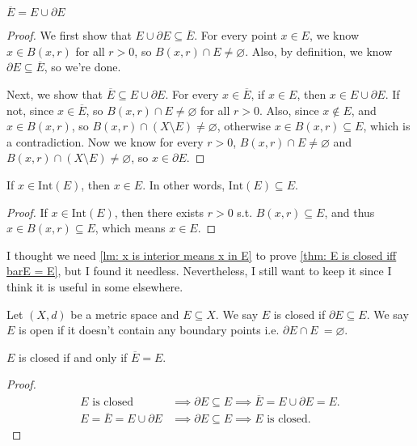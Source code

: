 \begin{lemma} \label{lm: Ebar is E cup pt E}
    \(\overline{E} = E \cup \partial E \) 
\end{lemma}
\begin{proof}
    We first show that \(E \cup \partial E \subseteq \overline{E} \). For every point \(x \in E\), we know \(x \in B(x, r)\) for all \(r > 0\), so \(B(x,r) \cap E \neq \varnothing \). Also, by definition, we know \(\partial E \subseteq \overline{E}\), so we're done. 
    
    Next, we show that \(\overline{E} \subseteq E \cup \partial E \). For every \(x \in \overline{E} \), if \(x \in E\), then \(x \in E \cup \partial E\). If not, since \(x \in \overline{E} \), so \(B(x, r) \cap E \neq \varnothing \) for all \(r>0\). Also, since \(x \notin E\), and \(x \in B(x, r)\), so \(B(x, r) \cap (X \setminus E) \neq \varnothing \), otherwise \(x \in B(x, r) \subseteq E\), which is a contradiction. Now we know for every \(r>0\), \(B(x,r) \cap E \neq \varnothing \) and \(B(x,r) \cap (X \setminus E) \neq  \varnothing \), so \(x \in \partial E\).           
\end{proof}

\begin{lemma}[Discarded] \label{lm: x is interior means x in E}
    If \(x \in \mathrm{Int}(E) \), then \(x \in E\). In other words, \(\mathrm{Int}(E) \subseteq E \). 
\end{lemma}
\begin{proof}
    If \(x \in \mathrm{Int}(E) \), then there exists \(r > 0\) s.t. \(B(x, r) \subseteq E\), and thus \(x \in B(x, r) \subseteq E\), which means \(x \in E\).     
\end{proof}

\begin{note}
    I thought we need \autoref{lm: x is interior means x in E} to prove \autoref{thm: E is closed iff barE = E}, but I found it needless. Nevertheless, I still want to keep it since I think it is useful in some elsewhere.
\end{note}

\begin{definition}
    Let \((X, d)\) be a metric space and \(E \subseteq X\). We say \(E\) is closed if \(\partial E \subseteq E\).  
    We say \(E\) is open if it doesn't contain any boundary points i.e. \(\partial E \cap E\ = \varnothing \).  
\end{definition}

\begin{theorem} \label{thm: E is closed iff barE = E}
    \(E\) is closed if and only if \(\overline{E} = E \).  
\end{theorem}
\begin{proof}
    \begin{align*}
        E \text{ is closed } &\implies  \partial E \subseteq E \implies \overline{E} = E \cup \partial E = E. \\
        E = \overline{E} = E \cup \partial E &\implies \partial E \subseteq E \implies E \text{ is closed}.  
    \end{align*}  
\end{proof}

